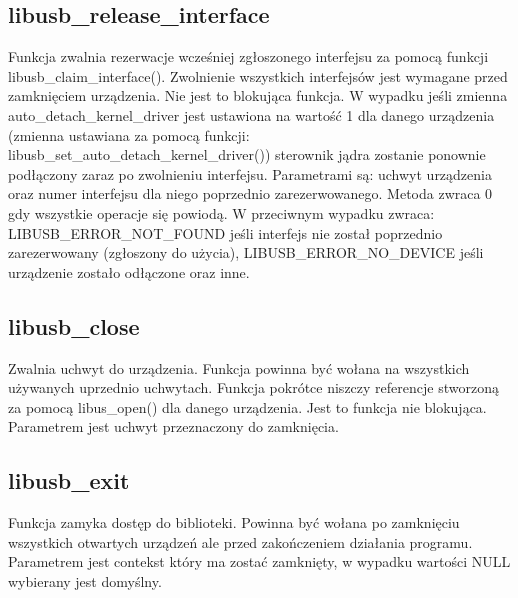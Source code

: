 \documentclass{BscUS}
\begin{document}
\subsection{libusb\_release\_interface}
Funkcja zwalnia rezerwacje wcześniej zgłoszonego interfejsu za pomocą funkcji libusb\_claim\_interface().
\newline
Zwolnienie wszystkich interfejsów jest wymagane przed zamknięciem urządzenia.
\newline
Nie jest to blokująca funkcja.
\newline
W wypadku jeśli zmienna auto\_detach\_kernel\_driver jest ustawiona na wartość 1 dla danego urządzenia (zmienna ustawiana za pomocą funkcji: libusb\_set\_auto\_detach\_kernel\_driver()) sterownik jądra zostanie ponownie podłączony zaraz po zwolnieniu interfejsu.
\newline
Parametrami są: uchwyt urządzenia oraz numer interfejsu dla niego poprzednio zarezerwowanego.
\newline
Metoda zwraca 0 gdy wszystkie operacje się powiodą.
\newline
W przeciwnym wypadku zwraca: LIBUSB\_ERROR\_NOT\_FOUND jeśli interfejs nie został poprzednio zarezerwowany (zgłoszony do użycia), LIBUSB\_ERROR\_NO\_DEVICE jeśli urządzenie zostało odłączone oraz inne.
\subsection{libusb\_close}
Zwalnia uchwyt do urządzenia.
\newline
Funkcja powinna być wołana na wszystkich używanych uprzednio uchwytach.
\newline
Funkcja pokrótce niszczy referencje stworzoną za pomocą libus\_open() dla danego urządzenia.
\newline
Jest to funkcja nie blokująca.
\newline
Parametrem jest uchwyt przeznaczony do zamknięcia.

\subsection{libusb\_exit}
Funkcja zamyka dostęp do biblioteki.
\newline
Powinna być wołana po zamknięciu wszystkich otwartych urządzeń ale przed zakończeniem działania programu.
\newline
Parametrem jest contekst który ma zostać zamknięty, w wypadku wartości NULL wybierany jest domyślny.

\end{document}
